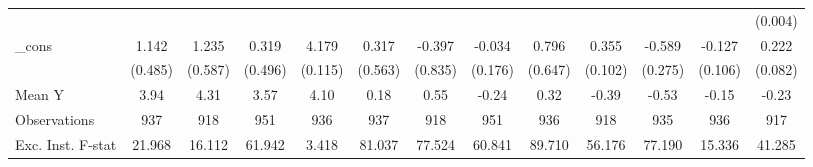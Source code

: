 {\begin{tabular}{l*{12}{c}}
            &                     &                     &                     &                     &                     &                     &                     &                     &                     &                     &                     &     (0.004)         \\
\addlinespace
\_cons      &       1.142\sym{**} &       1.235\sym{**} &       0.319         &       4.179\sym{***}&       0.317         &      -0.397         &      -0.034         &       0.796         &       0.355\sym{***}&      -0.589\sym{**} &      -0.127         &       0.222\sym{***}\\
            &     (0.485)         &     (0.587)         &     (0.496)         &     (0.115)         &     (0.563)         &     (0.835)         &     (0.176)         &     (0.647)         &     (0.102)         &     (0.275)         &     (0.106)         &     (0.082)         \\
\midrule
Mean Y      &        3.94         &        4.31         &        3.57         &        4.10         &        0.18         &        0.55         &       -0.24         &        0.32         &       -0.39         &       -0.53         &       -0.15         &       -0.23         \\
Observations&         937         &         918         &         951         &         936         &         937         &         918         &         951         &         936         &         918         &         935         &         936         &         917         \\
Exc. Inst. F-stat&      21.968         &      16.112         &      61.942         &       3.418         &      81.037         &      77.524         &      60.841         &      89.710         &      56.176         &      77.190         &      15.336         &      41.285         \\
\bottomrule
\end{tabular}
}
